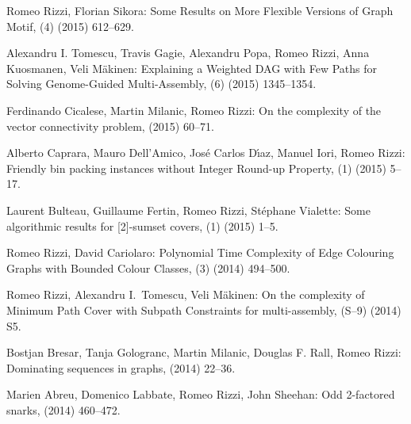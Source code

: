\begin{etaremune}
  \item {\sc Romeo Rizzi, Florian Sikora:}
   \newblock Some Results on More Flexible Versions of Graph Motif,
   (4) (2015) 612--629.

  \item {\sc Alexandru I. Tomescu, Travis Gagie, Alexandru Popa, Romeo Rizzi, Anna Kuosmanen, Veli Mäkinen:}
   \newblock Explaining a Weighted DAG with Few Paths for Solving Genome-Guided Multi-Assembly,
   (6) (2015) 1345--1354.

  \item {\sc Ferdinando Cicalese, Martin Milanic, Romeo Rizzi:}
   \newblock On the complexity of the vector connectivity problem,
    (2015) 60--71.        

  \item {\sc Alberto Caprara, Mauro Dell'Amico, Jos\'e Carlos D\'\i{}az, Manuel Iori, Romeo Rizzi:}
   \newblock Friendly bin packing instances without Integer Round-up Property,
   (1) (2015) 5--17.

  \item {\sc Laurent Bulteau, Guillaume Fertin, Romeo Rizzi, St\'ephane Vialette:}
   \newblock  Some algorithmic results for [2]-sumset covers,
   (1) (2015) 1--5.

  \item {\sc Romeo Rizzi, David Cariolaro:}
   \newblock  Polynomial Time Complexity of Edge Colouring Graphs with Bounded Colour Classes,
   (3) (2014) 494--500.

  \item {\sc Romeo Rizzi, Alexandru I.~Tomescu, Veli M\"akinen:}
   \newblock  On the complexity of Minimum Path Cover with Subpath Constraints for multi-assembly,
   (S--9) (2014) S5.

  \item {\sc Bostjan Bresar, Tanja Gologranc, Martin Milanic, Douglas F. Rall, Romeo Rizzi:}
   \newblock  Dominating sequences in graphs,
    (2014) 22--36.

  \item {\sc Marien Abreu, Domenico Labbate, Romeo Rizzi, John Sheehan:}
   \newblock  Odd 2-factored snarks,
    (2014) 460--472.


\end{etaremune}
